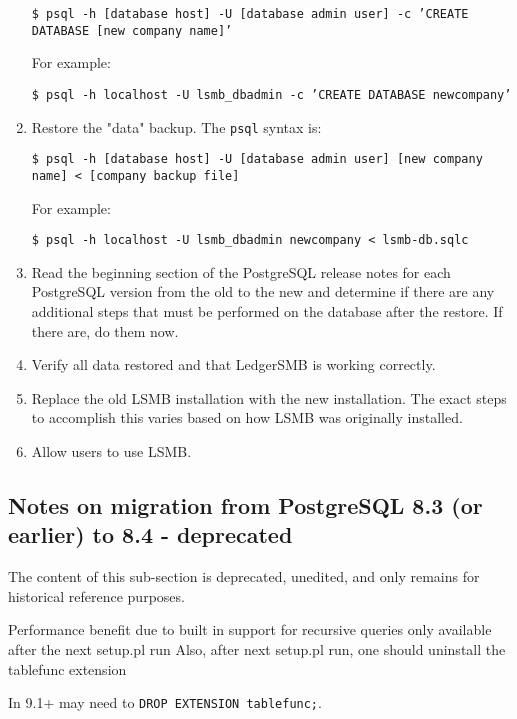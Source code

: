 \begin{enumerate}
        
        \texttt{\$ psql -h [database host] -U [database admin user] -c 'CREATE DATABASE [new company name]'}
        
        For example:
        
        \texttt{\$ psql -h localhost -U lsmb\_dbadmin -c 'CREATE DATABASE newcompany'}
    \item Restore the "data" backup. The \texttt{psql} syntax is:
    
        \texttt{\$ psql -h [database host] -U [database admin user] [new company name] < [company backup file]}
        
        For example:
        
        \texttt{\$ psql -h localhost -U lsmb\_dbadmin newcompany < lsmb-db.sqlc}
    \item Read the beginning section of the PostgreSQL release notes for each PostgreSQL version from the old to the new and determine
        if there are any additional steps that must be performed on the database after the restore. 
        If there are, do them now.
    \item Verify all data restored and that LedgerSMB is working correctly.
    \item Replace the old LSMB installation with the new installation. 
        The exact steps to accomplish this varies based on how LSMB was originally installed.
    \item Allow users to use LSMB.
\end{enumerate}

\subsection{Notes on migration from PostgreSQL 8.3 (or earlier) to 8.4 - deprecated }
\label{subsec-migration-pre84-to84plus}

\vspace{5mm}
\begin{center}
\large{The content of this sub-section is deprecated, unedited, and only remains for historical reference purposes.}
\end{center}
\vspace{5mm}

Performance benefit due to built in support for recursive queries only available
after the next setup.pl run
Also, after next setup.pl run, one should uninstall the tablefunc extension

In 9.1+ may need to \texttt{DROP EXTENSION tablefunc;}.

